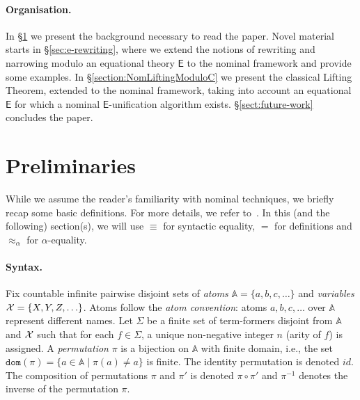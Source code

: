 \documentclass[submission,copyright,creativecommons]{eptcs}
\newcommand{\atomSet}{\mathbb{A}}
\newcommand{\dom}[1]{\mathtt{dom}(#1)}
\newcommand{\theory}[1]{\ensuremath{\mathsf{#1}}}
\theoremstyle{plain}
\theoremstyle{definition}
\theoremstyle{remark}
\begin{document}
\paragraph*{Organisation.}  In \S\ref{sec:preliminaries} we present the background necessary to read the paper. Novel material starts in  \S\ref{sec:e-rewriting}, where we extend the notions of rewriting and narrowing modulo an equational theory \theory{E} to the nominal framework and provide some examples. In \S\ref{section:NomLiftingModuloC} we present the classical Lifting Theorem, extended to the nominal framework, taking into account an equational \theory{E} for which a nominal $\theory{E}$-unification algorithm exists. \S\ref{sect:future-work} concludes the paper.


\section{Preliminaries}\label{sec:preliminaries}

 While we assume the reader's familiarity with nominal techniques, we briefly recap some basic definitions. For more details, we refer to~\cite{NominalRewriting/FernandezG07}. In this (and the following) section(s), we will use $\equiv$ for syntactic equality, $=$ for definitions and $\approx_\alpha$ for $\alpha$-equality.

\paragraph{Syntax.}
Fix countable infinite pairwise disjoint sets of {\em atoms} \(\mathbb{A} = \{a,b,c,\ldots \}\) and {\em variables} \({\cal X} = \{X, Y, Z, \ldots \}\).
Atoms follow the \textit{atom convention}: atoms \(a, b, c,\ldots \)  over \(\atomSet\) represent different names.
Let \(\Sigma\) be a finite set of term-formers disjoint from \(\mathbb{A}\) and \({\cal X}\) such that for each \(f \in \Sigma\), a unique non-negative integer \(n\) (arity of \(f\)) is assigned.
A \textit{permutation} \(\pi\) is a bijection on \(\atomSet\) with finite domain, i.e., the set \(\dom{\pi} = \{a \in \atomSet \mid \pi(a) \neq a \}\) is finite. The identity permutation is denoted $id$. The composition of permutations $\pi$ and $\pi'$ is denoted $\pi\circ \pi'$ and $\pi^{-1}$ denotes the inverse of the permutation $\pi$.   
\end{document}

